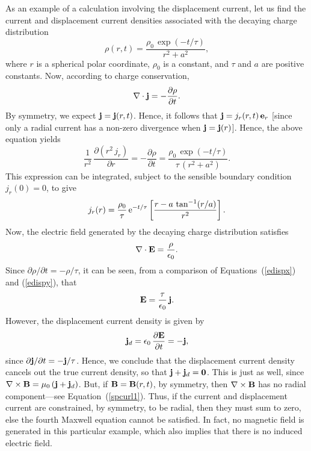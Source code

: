 As an example of a calculation involving the displacement current,
let us find the current and displacement current densities associated with the
decaying charge distribution
\begin{equation}
\rho(r,t) = \frac{\rho_0\,\exp(-t/\tau)}{r^2+a^2},
\end{equation}
where $r$ is a spherical polar coordinate, $\rho_0$ is a constant, and $\tau$ and $a$ are positive constants.
Now, according to charge conservation,
\begin{equation}\label{edispx}
\nabla\cdot{\bf j} = -\frac{\partial \rho}{\partial t}.
\end{equation}
By symmetry, we expect ${\bf j}={\bf j}(r,t)$. Hence, it follows that
${\bf j} = j_r(r,t)\,{\bf e}_r$ [since only a radial current has a non-zero
divergence when ${\bf j}= {\bf j}(r)$]. Hence, the above equation
yields
\begin{equation}
\frac{1}{r^2}\,\frac{\partial (r^2\,j_r)}{\partial r} = - \frac{\partial \rho}{\partial t} = \frac{\rho_0\,\exp(-t/\tau)}{\tau\,(r^2+a^2)}.
\end{equation}
This expression can be integrated, subject to the sensible boundary condition
$j_r(0)= 0$, to give
\begin{equation}
j_r(r) = \frac{\rho_0}{\tau}\,{\rm e}^{-t/\tau}\left[\frac{r-a\,\tan^{-1}(r/a)}{r^2}\right].
\end{equation}
Now, the electric field generated by the decaying charge
distribution satisfies
\begin{equation}\label{edispy}
\nabla\cdot{\bf E} = \frac{\rho}{\epsilon_0}.
\end{equation}
Since $\partial\rho/\partial t=-\rho/\tau$, it can be seen, from a comparison
of Equations~(\ref{edispx}) and (\ref{edispy}), that 
\begin{equation}
{\bf E} =\frac{\tau}{\epsilon_0}\,{\bf j}.
\end{equation}
However, the displacement current density is given by
\begin{equation}
{\bf j}_d = \epsilon_0\,\frac{\partial {\bf E}}{\partial t} = - {\bf j},
\end{equation}
since $\partial {\bf j}/\partial t = - {\bf j}/\tau$. Hence, we conclude that
the displacement current density cancels out the true current density, so that ${\bf j} + {\bf j}_d = {\bf 0}$. This is just as well, since $\nabla\times {\bf B} = \mu_0\,({\bf j} + {\bf j}_d)$. But, if ${\bf B}= {\bf B}(r,t)$, by symmetry, then
$\nabla\times {\bf B}$ has no radial component---see Equation~(\ref{spcurl1}). Thus, if the
current and displacement current are constrained, by symmetry,  to be radial, 
then they must sum to zero, else the fourth Maxwell equation cannot be
satisfied. In fact, no magnetic field is generated in this particular example,
which also implies that there is no induced electric field.

